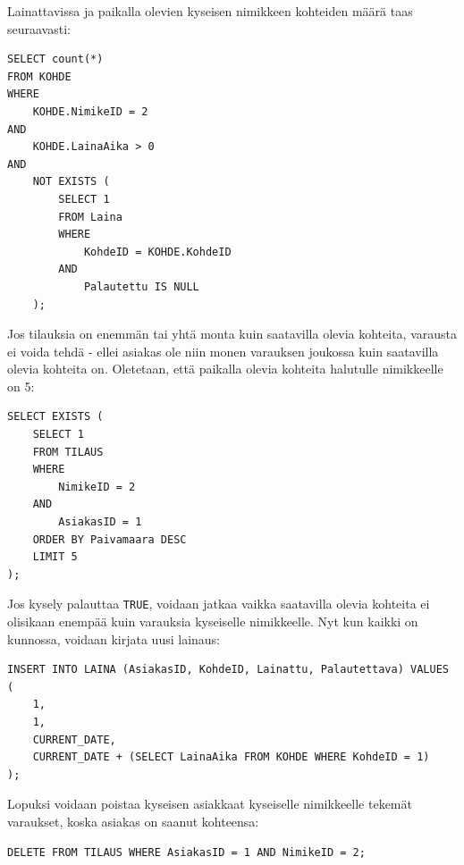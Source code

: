 \documentclass{article}
\begin{document}
Lainattavissa ja paikalla olevien kyseisen nimikkeen kohteiden määrä taas seuraavasti:

\begin{lstlisting}
SELECT count(*) 
FROM KOHDE
WHERE
    KOHDE.NimikeID = 2
AND
    KOHDE.LainaAika > 0
AND
    NOT EXISTS (
        SELECT 1
        FROM Laina
        WHERE
            KohdeID = KOHDE.KohdeID
        AND
            Palautettu IS NULL
    );
\end{lstlisting}

Jos tilauksia on enemmän tai yhtä monta kuin saatavilla olevia kohteita, varausta ei voida tehdä - ellei asiakas ole niin monen varauksen joukossa kuin saatavilla olevia kohteita on. Oletetaan, että paikalla olevia kohteita halutulle nimikkeelle on 5:

\begin{lstlisting}
SELECT EXISTS (
    SELECT 1
    FROM TILAUS
    WHERE
        NimikeID = 2
    AND
        AsiakasID = 1
    ORDER BY Paivamaara DESC
    LIMIT 5
);
\end{lstlisting}

Jos kysely palauttaa \texttt{TRUE}, voidaan jatkaa vaikka saatavilla olevia kohteita ei olisikaan enempää kuin varauksia kyseiselle nimikkeelle. Nyt kun kaikki on kunnossa, voidaan kirjata uusi lainaus:

\begin{lstlisting}
INSERT INTO LAINA (AsiakasID, KohdeID, Lainattu, Palautettava) VALUES (
    1,
    1,
    CURRENT_DATE,
    CURRENT_DATE + (SELECT LainaAika FROM KOHDE WHERE KohdeID = 1)
);
\end{lstlisting}

Lopuksi voidaan poistaa kyseisen asiakkaat kyseiselle nimikkeelle tekemät varaukset, koska asiakas on saanut kohteensa:

\begin{lstlisting}
DELETE FROM TILAUS WHERE AsiakasID = 1 AND NimikeID = 2;
\end{lstlisting}
\end{document}
